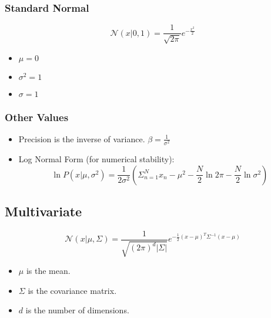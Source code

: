 \documentclass[12pt]{article}
\begin{document}
            \subsubsection{Standard Normal}
                \begin{equation}
                    \mathcal{N}(x | 0, 1) = \frac{1}{\sqrt{2\pi}}e^{-\frac{x^2}{2}}
                \end{equation}
                \begin{itemize}
                    \item $\mu = 0$
                    \item $\sigma^2 = 1$
                    \item $\sigma = 1$
                \end{itemize}
            \subsubsection{Other Values}
                \begin{itemize}
                    \item Precision is the inverse of variance. $\beta = \frac{1}{\sigma^2}$
                    \item Log Normal Form (for numerical stability):
                    \begin{equation}
                        \ln{P(x | \mu, \sigma^2)} = \frac{1}{2\sigma^2} \left(\Sigma_{n=1}^N {x_n-\mu}^2 - \frac{N}{2}\ln{2\pi} - \frac{N}{2}\ln{\sigma^2}\right)
                    \end{equation}
                \end{itemize}
        \subsection{Multivariate}
            \begin{equation}
                \mathcal{N}(x | \mu, \Sigma) = \frac{1}{\sqrt{{(2\pi)}^d|\Sigma|}}e^{-\frac{1}{2}{(x - \mu)}^T\Sigma^{-1}(x - \mu)}
            \end{equation}
            \begin{itemize}
                \item $\mu$ is the mean.
                \item $\Sigma$ is the covariance matrix.
                \item $d$ is the number of dimensions.
            \end{itemize}
\end{document}
